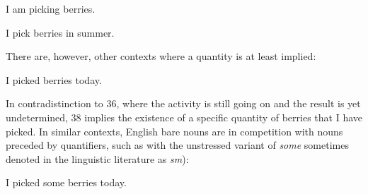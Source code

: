 \begin{listWWNumileveli}
\item 

\begin{styleExample}
\label{bkm:Ref78699401}I am picking berries.

\end{styleExample}

\item 

\begin{styleExample}
\label{bkm:Ref95014405}I pick berries in summer.

\end{styleExample}

\end{listWWNumileveli}

\begin{styleBodyTextFirst}
There are, however, other contexts where a quantity is at least implied:

\end{styleBodyTextFirst}

\begin{listWWNumileveli}
\item 

\begin{styleExample}
\label{bkm:Ref78699451}I picked berries today. 

\end{styleExample}

\end{listWWNumileveli}

\begin{styleBodyTextFirst}
In contradistinction to 36, where the activity is still going on and the result is yet undetermined, 38 implies the existence of a specific quantity of berries that I have picked. In similar contexts, English bare nouns are in competition with nouns preceded by quantifiers, such as with the unstressed variant of \textit{some} sometimes denoted in the linguistic literature as \textit{sm}):

\end{styleBodyTextFirst}

\begin{listWWNumileveli}
\item 

\begin{styleExample}
I picked some berries today.

\end{styleExample}

\end{listWWNumileveli}

